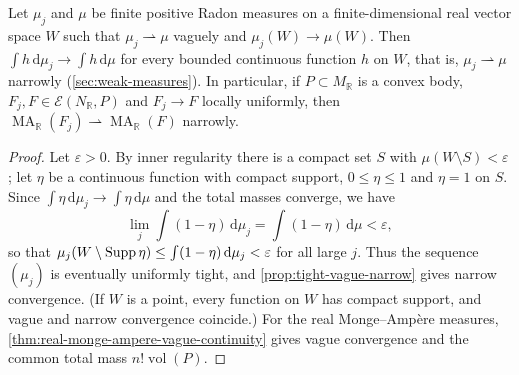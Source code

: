 \begin{lemma}\label{lem:full-mass-real-measure-bounded-testing}
Let $\mu_j$ and $\mu$ be finite positive Radon measures on a finite-dimensional real vector space $W$ such that $\mu_j\rightharpoonup\mu$ vaguely and $\mu_j(W)\to\mu(W)$. Then $\int h\,\mathrm d\mu_j\to\int h\,\mathrm d\mu$ for every bounded continuous function $h$ on $W$, that is, $\mu_j\rightharpoonup\mu$ narrowly (\cref{sec:weak-measures}). In particular, if $P\subset M_{\mathbb R}$ is a convex body, $F_j,F\in\mathcal E(N_{\mathbb R},P)$ and $F_j\to F$ locally uniformly, then $\operatorname{MA}_{\mathbb R}(F_j)\rightharpoonup\operatorname{MA}_{\mathbb R}(F)$ narrowly.
\end{lemma}
\begin{proof}
Let $\varepsilon>0$. By inner regularity there is a compact set $S$ with $\mu(W\setminus S)<\varepsilon$; let $\eta$ be a continuous function with compact support, $0\leq\eta\leq1$ and $\eta=1$ on $S$. Since $\int\eta\,\mathrm d\mu_j\to\int\eta\,\mathrm d\mu$ and the total masses converge, we have
\[
 \lim_j\int(1-\eta)\,\mathrm d\mu_j
       =\int(1-\eta)\,\mathrm d\mu<\varepsilon,
\]
so that $\mu_j(W\setminus\operatorname{Supp}\eta)\leq\int(1-\eta)\,\mathrm d\mu_j<\varepsilon$ for all large $j$. Thus the sequence $(\mu_j)$ is eventually uniformly tight, and \cref{prop:tight-vague-narrow} gives narrow convergence. (If $W$ is a point, every function on $W$ has compact support, and vague and narrow convergence coincide.) For the real Monge--Amp\`ere measures, \cref{thm:real-monge-ampere-vague-continuity} gives vague convergence and the common total mass $n!\operatorname{vol}(P)$.
\end{proof}
